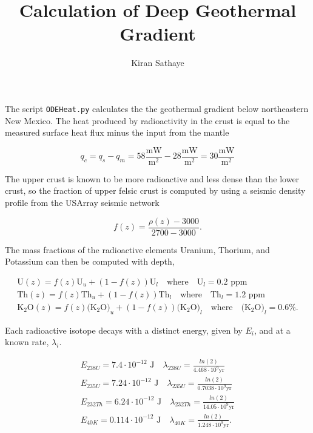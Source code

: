 \documentclass[a4paper,10pt]{article}
\title{Calculation of Deep Geothermal Gradient}
\author{Kiran Sathaye}
\begin{document}
\maketitle

\noindent The script \texttt{ODEHeat.py} calculates the the geothermal gradient below northeastern New Mexico. The heat produced by radioactivity in the crust is equal to the measured surface heat flux minus the input from the mantle

\begin{equation}
q_c=q_s-q_m = 58\frac{\text{mW}}{\text{m}^2}-28\frac{\text{mW}}{\text{m}^2}=30\frac{\text{mW}}{\text{m}^2}
\end{equation}

\noindent The upper crust is known to be more radioactive and less dense than the lower  crust, so the fraction of upper felsic crust is computed by using a seismic density profile from the USArray seismic network

\begin{equation}
f(z)=\frac{\rho(z)-3000}{2700-3000}.
\end{equation}

\noindent The mass fractions of the radioactive elements Uranium, Thorium, and Potassium can then be computed with depth,

\begin{eqnarray}
\text{U}(z)=f(z)\text{U}_{u}+(1-f(z))\text{U}_{l} \quad  \text{where} \quad  \text{U}_{l}=0.2\text{ ppm} \\
\text{Th}(z)=f(z)\text{Th}_{u}+(1-f(z))\text{Th}_{l} \quad  \text{where} \quad  \text{Th}_{l}=1.2\text{ ppm} \\
\text{K$_2$O}(z)=f(z)\text{(K$_2$O)}_{u}+(1-f(z))\text{(K$_2$O)}_{l} \quad \text{where} \quad   \text{(K$_2$O)}_{l}=0.6\%.
\end{eqnarray} 

\noindent Each radioactive isotope decays with a distinct energy, given by $E_{i}$, and at a known rate, $\lambda_i$.

\begin{eqnarray}
E_{238U}=7.4\cdot 10^{-12} \text{ J} \quad \lambda_{238U}=\frac{ln(2)}{4.468\cdot 10^9 \text{yr}} \\
E_{235U}=7.24\cdot 10^{-12} \text{ J} \quad \lambda_{235U}=\frac{ln(2)}{0.7038\cdot 10^9 \text{yr}} \\
E_{232Th}=6.24\cdot 10^{-12} \text{ J}  \quad \lambda_{232Th}=\frac{ln(2)}{14.05\cdot 10^9 \text{yr}} \\
E_{40K}=0.114\cdot 10^{-12} \text{ J}  \quad \lambda_{40K}=\frac{ln(2)}{1.248\cdot 10^9 \text{yr}}.
\end{eqnarray}
\end{document}
